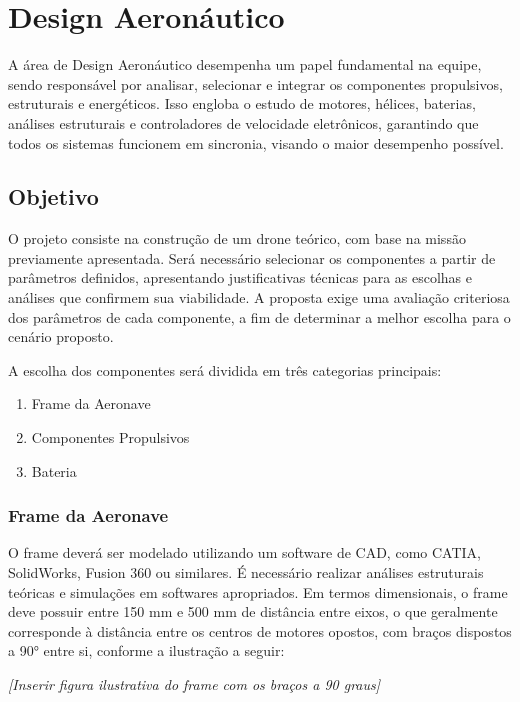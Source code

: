 \section{Design Aeronáutico}

A área de Design Aeronáutico desempenha um papel fundamental na equipe, sendo responsável por analisar, selecionar e integrar os componentes propulsivos, estruturais e energéticos. Isso engloba o estudo de motores, hélices, baterias, análises estruturais e controladores de velocidade eletrônicos, garantindo que todos os sistemas funcionem em sincronia, visando o maior desempenho possível.

\subsection*{Objetivo}

O projeto consiste na construção de um drone teórico, com base na missão previamente apresentada. Será necessário selecionar os componentes a partir de parâmetros definidos, apresentando justificativas técnicas para as escolhas e análises que confirmem sua viabilidade. A proposta exige uma avaliação criteriosa dos parâmetros de cada componente, a fim de determinar a melhor escolha para o cenário proposto.

A escolha dos componentes será dividida em três categorias principais:
\begin{enumerate}
    \item Frame da Aeronave
    \item Componentes Propulsivos
    \item Bateria
\end{enumerate}

\subsubsection*{Frame da Aeronave}

O frame deverá ser modelado utilizando um software de CAD, como CATIA, SolidWorks, Fusion 360 ou similares. É necessário realizar análises estruturais teóricas e simulações em softwares apropriados. Em termos dimensionais, o frame deve possuir entre 150 mm e 500 mm de distância entre eixos, o que geralmente corresponde à distância entre os centros de motores opostos, com braços dispostos a 90° entre si, conforme a ilustração a seguir:

\vspace{0.5cm}
\begin{center}
\textit{[Inserir figura ilustrativa do frame com os braços a 90 graus]}
\end{center}
\vspace{0.5cm}

